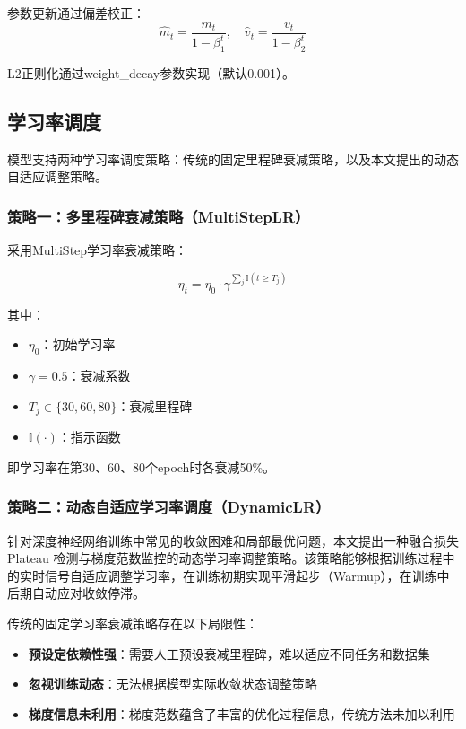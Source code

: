 \documentclass[UTF8, a4paper, 12pt]{article}
\begin{document}
参数更新通过偏差校正：
\begin{equation}
\hat{m}_t = \frac{m_t}{1 - \beta_1^t}, \quad \hat{v}_t = \frac{v_t}{1 - \beta_2^t}
\end{equation}

L2正则化通过weight\_decay参数实现（默认0.001）。

\subsection{学习率调度}

模型支持两种学习率调度策略：传统的固定里程碑衰减策略，以及本文提出的动态自适应调整策略。

\subsubsection{策略一：多里程碑衰减策略（MultiStepLR）}

采用MultiStep学习率衰减策略：

\begin{equation}
\eta_t = \eta_0 \cdot \gamma^{\sum_{j} \mathbb{I}(t \geq T_j)}
\end{equation}

其中：
\begin{itemize}
    \item $\eta_0$：初始学习率
    \item $\gamma = 0.5$：衰减系数
    \item $T_j \in \{30, 60, 80\}$：衰减里程碑
    \item $\mathbb{I}(\cdot)$：指示函数
\end{itemize}

即学习率在第30、60、80个epoch时各衰减50\%。

\subsubsection{策略二：动态自适应学习率调度（DynamicLR）}

针对深度神经网络训练中常见的收敛困难和局部最优问题，本文提出一种融合损失 Plateau 检测与梯度范数监控的动态学习率调整策略。该策略能够根据训练过程中的实时信号自适应调整学习率，在训练初期实现平滑起步（Warmup），在训练中后期自动应对收敛停滞。


传统的固定学习率衰减策略存在以下局限性：

\begin{itemize}
    \item \textbf{预设定依赖性强}：需要人工预设衰减里程碑，难以适应不同任务和数据集
    \item \textbf{忽视训练动态}：无法根据模型实际收敛状态调整策略
    \item \textbf{梯度信息未利用}：梯度范数蕴含了丰富的优化过程信息，传统方法未加以利用
\end{itemize}
\end{document}
